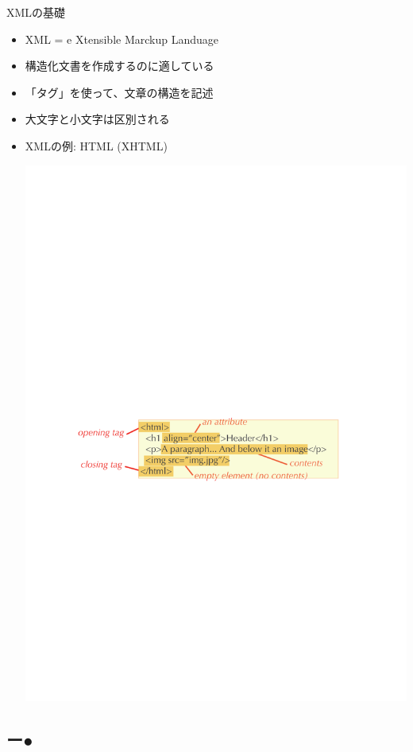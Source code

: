 \begin{frame}{XMLの基礎}
  \begin{itemize}
  \item XML = e{\color{red} X}tensible {\color{red} M}arckup {\color{red} L}anduage
  \item 構造化文書を作成するのに適している
  \item 「タグ」を使って、文章の構造を記述
  \item 大文字と小文字は区別される
  \item XMLの例: HTML (XHTML)
  \begin{center}
    \includegraphics[height=0.3\textheight]{xml1.pdf}
  \end{center}
  \end{itemize}
\end{frame}

\subsection*{{\protect\color{red}ー}{\protect\color{blue}●}}

